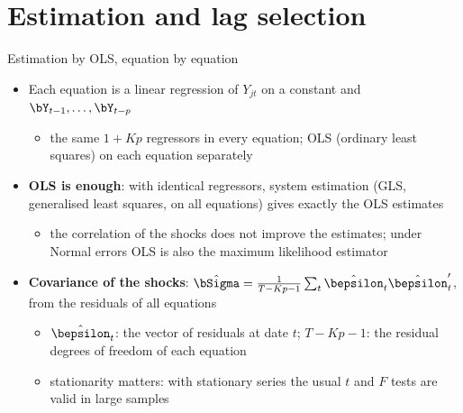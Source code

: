 \section{Estimation and lag selection}

\begin{frame}{Estimation by OLS, equation by equation}
\itemsize{\small}
\begin{itemize}
    \item Each equation is a linear regression of $Y_{jt}$ on a constant and $\bY_{t-1}, \dots, \bY_{t-p}$
    \begin{itemize}
        \item the same $1 + Kp$ regressors in every equation; OLS (ordinary least squares) on each equation separately
    \end{itemize}
    \item \textbf{OLS is enough}: with identical regressors, system estimation (GLS, generalised least squares, on all equations) gives exactly the OLS estimates
    \begin{itemize}
        \item the correlation of the shocks does not improve the estimates; under Normal errors OLS is also the maximum likelihood estimator
    \end{itemize}
    \item \textbf{Covariance of the shocks}: $\hat\bSigma = \frac{1}{T - Kp - 1}\sum_t\hat\bepsilon_t\hat\bepsilon_t'$, from the residuals of all equations
    \begin{itemize}
        \item $\hat\bepsilon_t$: the vector of residuals at date $t$; $T - Kp - 1$: the residual degrees of freedom of each equation
        \item stationarity matters: with stationary series the usual $t$ and $F$ tests are valid in large samples
    \end{itemize}
\end{itemize}
\end{frame}

